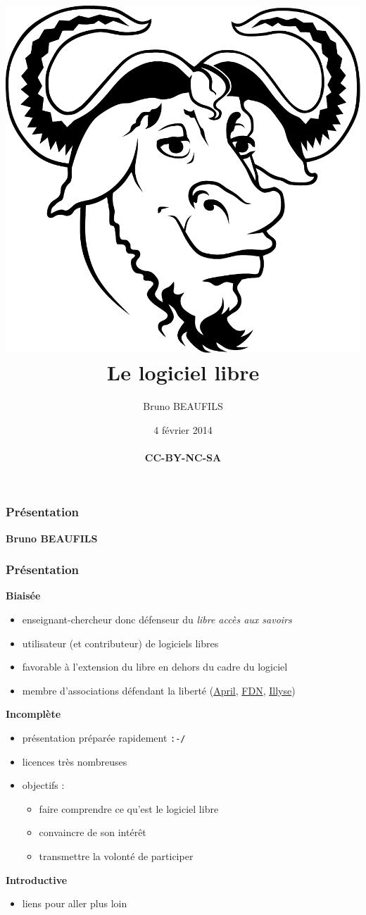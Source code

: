 \documentclass[10pt]{beamer}
\title[Le logiciel libre]{%
  \includegraphics[width=.2\columnwidth]{gnu-head}\\
  Le logiciel libre}
\author[B. Beaufils]{Bruno BEAUFILS}
\institute[Lille 1]{\textbf{Université~Lille~1}}
\date{4 février 2014\\{\ccbyncsa}\\\textbf{\scriptsize CC-BY-NC-SA}}
\begin{document}
\maketitle


\begin{frame}
  \frametitle{Présentation }

  \begin{center}
    \Large
    \vfill
    \textbf{Bruno BEAUFILS}
    \vfill
    \vfill\vfill
    \vfill
    \vfill
    \vfill\null
  \end{center}  
\end{frame}


\begin{frame}
  \frametitle{Présentation}

  \textbf{Biaisée}
  
  \begin{itemize}
  \item enseignant-chercheur donc défenseur du \emph{libre accès aux savoirs}
  \item utilisateur (et contributeur) de logiciels libres
  \item favorable à l'extension du libre en dehors du cadre du logiciel
  \item membre d'associations défendant la liberté
    (\href{http://www.april.org}{April},
    \href{http://www.fdn.fr}{FDN},
    \href{http://www.illyse.net}{Illyse})
  \end{itemize}
  \vfill

  \textbf{Incomplète}
  \begin{itemize}
  \item présentation préparée rapidement \texttt{:-/}
  \item licences très nombreuses
  \item objectifs :
    \begin{itemize}
    \item faire comprendre ce qu'est le logiciel libre
    \item convaincre de son intérêt
    \item transmettre la volonté de participer      
    \end{itemize}
  \end{itemize}

  \vfill

  \textbf{Introductive}
  \begin{itemize}
  \item liens pour aller plus loin
  \end{itemize}  
\end{frame}
\end{document}
